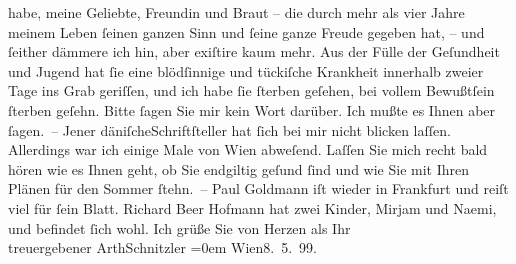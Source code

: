 \begin{ledgroupsized}[t]{13cm}
                    habe, meine Geliebte, Freundin und Braut – die durch mehr als vier Jahre meinem
                    Leben ſeinen ganzen Sinn und ſeine ganze Freude gegeben hat, – und ſeither
                    dämmere ich hin, aber exiſtire kaum mehr. Aus der Fülle der Geſundheit und
                    Jugend hat ſie eine blödſinnige und tückiſche Krankheit innerhalb zweier Tage
                    ins Grab geriſſen, und ich habe ſie ſterben geſehen, bei vollem Bewußt{\pb}ſein ſterben geſehn. Bitte ſagen Sie mir
                    kein Wort darüber. Ich mußte es Ihnen aber ſagen. –\pend
           \pstart
           Jener däniſcheSchriftſteller hat ſich bei
                    mir nicht blicken laſſen. Allerdings war ich einige Male von Wien abweſend. Laſſen Sie mich recht bald hören wie es
                    Ihnen geht, ob Sie endgiltig geſund ſind und wie Sie mit Ihren Plänen für den
                    Sommer ſtehn. –\pend
           \pstart
           Paul Goldmann iſt wieder in Frankfurt und reiſt viel für ſein Blatt.\pend
           \pstart
           {\pb}Richard Beer Hofmann hat zwei Kinder, Mirjam und Naemi, und befindet ſich
                    wohl.\pend
           \pstart
           Ich grüße Sie von Herzen als Ihr{\\[\baselineskip]}treuergebener
                        \spacefill\mbox{ArthSchnitzler}\pend
           \leftskip=0em{}\pstart
           Wien8. 5. 99.\pend
           \endnumbering{}\end{ledgroupsized}  \newcommand{\dateiname}{L00915}\newcommand{\titel}{Arthur Schnitzler an Georg Brandes, 8. 5. 1899}\newcommand{\editorInnen}{Martin Anton Müller und Gerd-Hermann Susen}
      